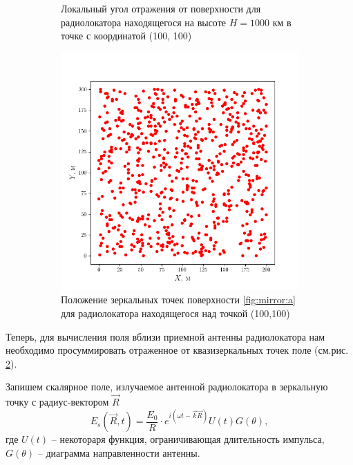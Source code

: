 \begin{figure}[h!]
\begin{subfigure}{.49\linewidth}
        \caption{Локальный угол отражения от поверхности для радиолокатора
        находящегося на высоте $H=1000$ км в точке с координатой (100, 100)}
        \label{fig:mirror:b}
    \end{subfigure}
    \begin{subfigure}{.49\linewidth}
        \centering
        \includegraphics[width=\linewidth]{fig/impulse/fig3}
        \caption{Положение зеркальных точек поверхности \ref{fig:mirror:a} для
        радиолокатора находящегося над точкой (100,100) }
        \label{fig:mirror:c}
    \end{subfigure}
    \label{fig:mirror}
    \caption{}
\end{figure}

Теперь, для вычисления поля вблизи приемной антенны радиолокатора нам
необходимо просуммировать отраженное от квазизеркальных точек поле
(см.рис. \ref{fig:mirror:c}).  


Запишем скалярное поле, излучаемое антенной радиолокатора в зеркальную точку с радиус-вектором $\vec
R$
\begin{equation}
    \label{eq:}
    E_{s}(\vec R,t) = \frac{E_0}{R}  \cdot  e^{i(\omega t - \vec k \vec
    R)} U(t)G(\theta), 
\end{equation}
где $U(t)$ -- некотораря функция, ограничивающая длительность импульса,
$G(\theta)$ -- диаграмма направленности антенны.

